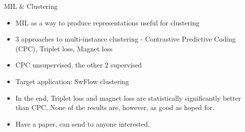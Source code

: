 \documentclass[10pt]{beamer}
\begin{document}
\begin{frame}{MIL \& Clustering}
	\begin{itemize}
		\item MIL as a way to produce representations useful for clustering
		\item 3 approaches to multi-instance clustering - Contrastive Predictive Coding (CPC), Triplet loss, Magnet loss
		\item CPC unsupervised, the other 2 supervised
		\item Target application: SwFlow clustering
		\item In the end, Triplet loss and magnet loss are statistically significantly better than CPC. None of the results are, however, as good as hoped for.
		\item Have a paper, can send to anyone interested.
	\end{itemize}
	\bigskip
	\begin{center}
	\end{center}
\end{frame}
\end{document}
